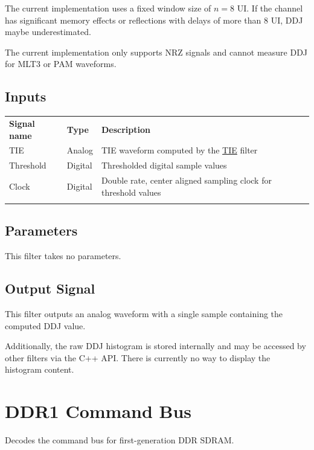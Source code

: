 The current implementation uses a fixed window size of $n=8$ UI. If the channel has significant memory effects or
reflections with delays of more than 8 UI, DDJ maybe underestimated.

The current implementation only supports NRZ signals and cannot measure DDJ for MLT3 or PAM waveforms.

\subsection{Inputs}

\begin{tabularx}{16cm}{llX}
\thickhline
\textbf{Signal name} & \textbf{Type} & \textbf{Description} \\
\thickhline
TIE & Analog & TIE waveform computed by the \hyperref[filter:tie]{TIE} filter\\
\thinhline
Threshold & Digital & Thresholded digital sample values\\
\thinhline
Clock & Digital & Double rate, center aligned sampling clock for threshold values\\
\thickhline
\end{tabularx}

\subsection{Parameters}

This filter takes no parameters.

\subsection{Output Signal}

This filter outputs an analog waveform with a single sample containing the computed DDJ value.

Additionally, the raw DDJ histogram is stored internally and may be accessed by other filters via the C++ API. There is
currently no way to display the histogram content.

\pagebreak
\section{DDR1 Command Bus}

Decodes the command bus for first-generation DDR SDRAM.

\pagebreak
